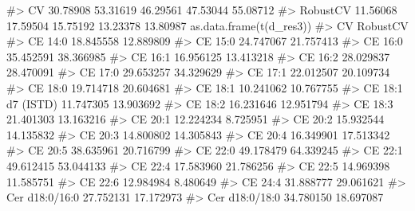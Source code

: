 \documentclass[
  letterpaper,
  DIV=11,
  numbers=noendperiod]{scrreprt}
\newenvironment{Shaded}{\begin{snugshade}}{\end{snugshade}}
\newcommand{\CommentTok}[1]{\textcolor[rgb]{0.37,0.37,0.37}{#1}}
\newcommand{\FunctionTok}[1]{\textcolor[rgb]{0.28,0.35,0.67}{#1}}
\newcommand{\NormalTok}[1]{\textcolor[rgb]{0.00,0.23,0.31}{#1}}
\begin{document}
\begin{Shaded}
\begin{Highlighting}[]
\CommentTok{\#\textgreater{} CV              30.78908 53.31619        46.29561 47.53044        55.08712}
\CommentTok{\#\textgreater{} RobustCV        11.56068 17.59504        15.75192 13.23378        13.80987}
\FunctionTok{as.data.frame}\NormalTok{(}\FunctionTok{t}\NormalTok{(d\_res3))}
\CommentTok{\#\textgreater{}                                                  CV  RobustCV}
\CommentTok{\#\textgreater{} CE 14:0                                   18.845558 12.889809}
\CommentTok{\#\textgreater{} CE 15:0                                   24.747067 21.757413}
\CommentTok{\#\textgreater{} CE 16:0                                   35.452591 38.366985}
\CommentTok{\#\textgreater{} CE 16:1                                   16.956125 13.413218}
\CommentTok{\#\textgreater{} CE 16:2                                   28.029837 28.470091}
\CommentTok{\#\textgreater{} CE 17:0                                   29.653257 34.329629}
\CommentTok{\#\textgreater{} CE 17:1                                   22.012507 20.109734}
\CommentTok{\#\textgreater{} CE 18:0                                   19.714718 20.604681}
\CommentTok{\#\textgreater{} CE 18:1                                   10.241062 10.767755}
\CommentTok{\#\textgreater{} CE 18:1 d7 (ISTD)                         11.747305 13.903692}
\CommentTok{\#\textgreater{} CE 18:2                                   16.231646 12.951794}
\CommentTok{\#\textgreater{} CE 18:3                                   21.401303 13.163216}
\CommentTok{\#\textgreater{} CE 20:1                                   12.224234  8.725951}
\CommentTok{\#\textgreater{} CE 20:2                                   15.932544 14.135832}
\CommentTok{\#\textgreater{} CE 20:3                                   14.800802 14.305843}
\CommentTok{\#\textgreater{} CE 20:4                                   16.349901 17.513342}
\CommentTok{\#\textgreater{} CE 20:5                                   38.635961 20.716799}
\CommentTok{\#\textgreater{} CE 22:0                                   49.178479 64.339245}
\CommentTok{\#\textgreater{} CE 22:1                                   49.612415 53.044133}
\CommentTok{\#\textgreater{} CE 22:4                                   17.583960 21.786256}
\CommentTok{\#\textgreater{} CE 22:5                                   14.969398 11.585751}
\CommentTok{\#\textgreater{} CE 22:6                                   12.984984  8.480649}
\CommentTok{\#\textgreater{} CE 24:4                                   31.888777 29.061621}
\CommentTok{\#\textgreater{} Cer d18:0/16:0                            27.752131 17.172973}
\CommentTok{\#\textgreater{} Cer d18:0/18:0                            34.780150 18.697087}

\end{Highlighting}
\end{Shaded}
\end{document}
